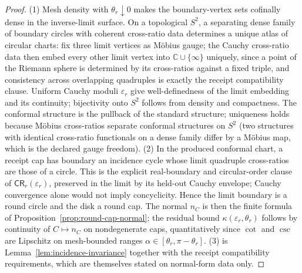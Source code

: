 \documentclass[11pt]{article}
\begin{document}
\begin{proof}
(1) Mesh density with \(\theta_r\downarrow0\) makes the boundary-vertex sets
cofinally dense in the inverse-limit surface. On a topological \(S^2\), a
separating dense family of boundary circles with coherent cross-ratio data
determines a unique atlas of circular charts: fix three limit vertices as
M\"obius gauge; the Cauchy cross-ratio data then embed every other limit
vertex into \(\mathbb C\cup\{\infty\}\) uniquely, since a point of the Riemann
sphere is determined by its cross-ratios against a fixed triple, and
consistency across overlapping quadruples is exactly the receipt
compatibility clause. Uniform Cauchy moduli \(\varepsilon_r\) give
well-definedness of the limit embedding and its continuity; bijectivity onto
\(S^2\) follows from density and compactness. The conformal structure is the
pullback of the standard structure; uniqueness holds because M\"obius
cross-ratios separate conformal structures on \(S^2\) (two structures with
identical cross-ratio functionals on a dense family differ by a M\"obius map,
which is the declared gauge freedom).
(2) In the produced conformal chart, a receipt cap has boundary an incidence
cycle whose limit quadruple cross-ratios are those of a circle. This is the
explicit real-boundary and circular-order clause of
\(\mathsf{CR}_r(\varepsilon_r)\), preserved in the limit by its held-out
Cauchy envelope; Cauchy convergence alone would not imply concyclicity.
Hence the limit boundary is a round circle and the disk a round cap. The
normal \(n_C\) is then the
finite formula of Proposition~\ref{prop:round-cap-normal}; the residual bound
\(\kappa(\varepsilon_r,\theta_r)\) follows by continuity of
\(C\mapsto n_C\) on nondegenerate caps, quantitatively since
\(\cot\) and \(\csc\) are Lipschitz on mesh-bounded ranges
\(\alpha\in[\theta_r,\pi-\theta_r]\).
(3) is Lemma~\ref{lem:incidence-invariance} together with the receipt
compatibility requirements, which are themselves stated on normal-form data
only.
\end{proof}
\end{document}
